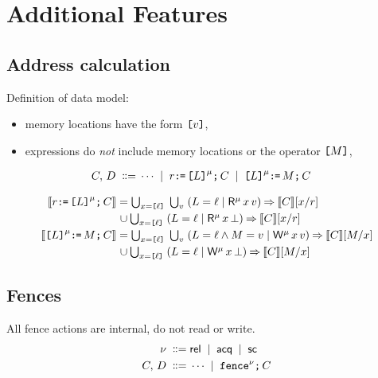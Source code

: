 \section{Additional Features}

\subsection{Address calculation}

Definition of data model:
\begin{itemize}
\item memory locations have the form $\texttt{[}v\texttt{]}$,
\item expressions do \emph{not} include memory locations or the operator $\texttt{[}M\texttt{]}$,
\end{itemize}

\begin{align*}
C,\,D
\;\mathrel{\mathord{\vcentcolon}\mkern-1mu\mathord{\vcentcolon}\mathord{{=}}}\;& \cdots
\;\mathrel{|}\; r\texttt{:}\mkern-1mu\texttt{=}\,\texttt{[}L\texttt{]}^{\mu}\texttt{;}\,\allowbreak C 
\;\mathrel{|}\; \texttt{[}L\texttt{]}^{\mu}\texttt{:}\mkern-1mu\texttt{=}\,M\texttt{;}\,\allowbreak C
\end{align*}

\begin{align*}
  \sem{\aReg\GETS\REF{\cExp}^\amode\SEMI \aCmd} & =
  \textstyle\bigcup_{\aLoc=\REF{\cVal}}\; \textstyle\bigcup_\aVal\; ({\cExp}=\cVal \mid \DRmode\aLoc\aVal) \prefix \sem{\aCmd}[\aLoc/\aReg] 
  \\ & \mkern2mu\cup \textstyle\bigcup_{\aLoc=\REF{\cVal}}\; ({\cExp}=\cVal \mid\iDRmode{\aLoc}{\aVal}) \prefix \sem{\aCmd}[\aLoc/\aReg]
  \\
  \sem{\REF{\cExp}^\amode\GETS\aExp\SEMI \aCmd} & =
  \textstyle\bigcup_{\aLoc=\REF{\cVal}}\; \textstyle\bigcup_\aVal\; ({\cExp}=\cVal \land \aExp=\aVal \mid \DWmode\aLoc\aVal) \prefix \sem{\aCmd}[\aExp/\aLoc]
  \\ & \mkern2mu\cup \textstyle\bigcup_{\aLoc=\REF{\cVal}}\; ({\cExp}=\cVal \mid \iDWmode{\aLoc}{\aVal}) \prefix \sem{\aCmd}[\aExp/\aLoc]  
\end{align*}

\subsection{Fences}

All fence actions are internal, do not read or write.
\begin{align*}
  \nu \;\mathrel{\mathord{\vcentcolon}\mkern-1mu\mathord{\vcentcolon}\mathord{{=}}}\;& {\mathsf{rel}} \;\mathrel{|}\; {\mathsf{acq}} \;\mathrel{|}\; {\mathsf{sc}}
  \\
  C,\,D
  \;\mathrel{\mathord{\vcentcolon}\mkern-1mu\mathord{\vcentcolon}\mathord{{=}}}\;& \cdots
  \;\mathrel{|}\; \texttt{fence}^{\nu} \texttt{;}\,\allowbreak C  
\end{align*}

